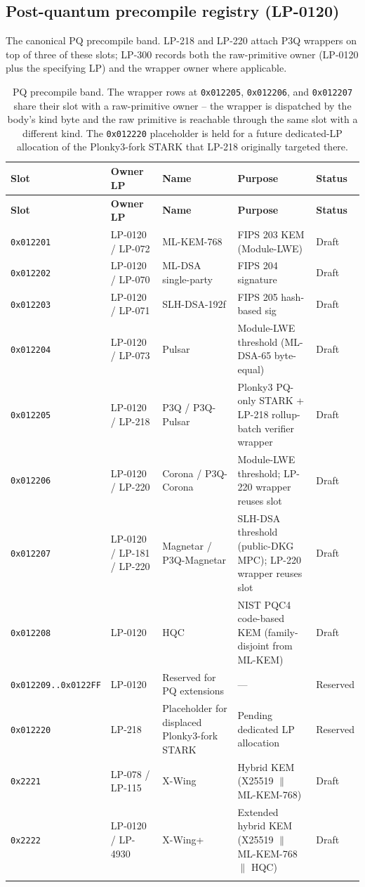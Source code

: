 \subsection{Post-quantum precompile registry (LP-0120)}
\label{sec:precomp-pq}

The canonical PQ precompile band. LP-218 and LP-220 attach P3Q
wrappers on top of three of these slots; LP-300 records both the
raw-primitive owner (LP-0120 plus the specifying LP) and the wrapper
owner where applicable.

\begin{longtable}{@{}p{3.2cm}p{2.4cm}p{2.8cm}p{3.2cm}p{1.2cm}@{}}
\toprule
\textbf{Slot} & \textbf{Owner LP} & \textbf{Name} & \textbf{Purpose} & \textbf{Status} \\
\midrule
\endfirsthead
\toprule
\textbf{Slot} & \textbf{Owner LP} & \textbf{Name} & \textbf{Purpose} & \textbf{Status} \\
\midrule
\endhead
\texttt{0x012201} & LP-0120 / LP-072 & ML-KEM-768 & FIPS 203 KEM (Module-LWE) & Draft \\
\texttt{0x012202} & LP-0120 / LP-070 & ML-DSA single-party & FIPS 204 signature & Draft \\
\texttt{0x012203} & LP-0120 / LP-071 & SLH-DSA-192f & FIPS 205 hash-based sig & Draft \\
\texttt{0x012204} & LP-0120 / LP-073 & Pulsar & Module-LWE threshold (ML-DSA-65 byte-equal) & Draft \\
\texttt{0x012205} & LP-0120 / LP-218 & P3Q / P3Q-Pulsar & Plonky3 PQ-only STARK + LP-218 rollup-batch verifier wrapper & Draft \\
\texttt{0x012206} & LP-0120 / LP-220 & Corona / P3Q-Corona & Module-LWE threshold; LP-220 wrapper reuses slot & Draft \\
\texttt{0x012207} & LP-0120 / LP-181 / LP-220 & Magnetar / P3Q-Magnetar & SLH-DSA threshold (public-DKG MPC); LP-220 wrapper reuses slot & Draft \\
\texttt{0x012208} & LP-0120 & HQC & NIST PQC4 code-based KEM (family-disjoint from ML-KEM) & Draft \\
\texttt{0x012209..0x0122FF} & LP-0120 & Reserved for PQ extensions & --- & Reserved \\
\texttt{0x012220} & LP-218 & Placeholder for displaced Plonky3-fork STARK & Pending dedicated LP allocation & Reserved \\
\texttt{0x2221} & LP-078 / LP-115 & X-Wing & Hybrid KEM (X25519 $\parallel$ ML-KEM-768) & Draft \\
\texttt{0x2222} & LP-0120 / LP-4930 & X-Wing+ & Extended hybrid KEM (X25519 $\parallel$ ML-KEM-768 $\parallel$ HQC) & Draft \\
\bottomrule
\caption{PQ precompile band. The wrapper rows at \texttt{0x012205},
\texttt{0x012206}, and \texttt{0x012207} share their slot with a
raw-primitive owner -- the wrapper is dispatched by the body's
kind byte and the raw primitive is reachable through the same slot
with a different kind. The \texttt{0x012220} placeholder is held
for a future dedicated-LP allocation of the Plonky3-fork STARK that
LP-218 originally targeted there.}
\label{tab:precomp-lp0120}
\end{longtable}

